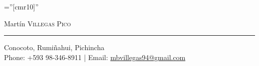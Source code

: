 \documentclass[a4paper,10.9pt]{article}
\begin{document}
  




\font\fb=''[cmr10]'' %


\begin{center}
{ \Huge Martín \textsc{Villegas Pico}}
\end{center}
\textcolor{black!30}{\rule[.1\baselineskip]{\textwidth}{1pt}}

\begin{center}
Conocoto, Rumiñahui, Pichincha\\
Phone: +593 98-346-8911 | Email: \href{mailto:mbvillegas94@gmail.com}{mbvillegas94@gmail.com}
\end{center}


%

\end{document}
